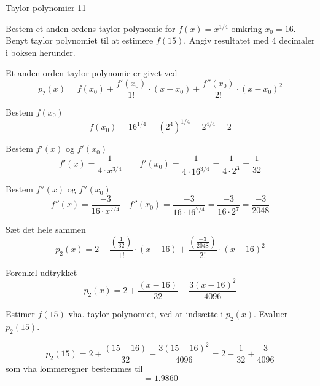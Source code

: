 \documentclass{article}
\begin{document}
\begin{exercise}{Taylor polynomier 11}
	
	Bestem et anden ordens taylor polynomie for $f(x) =x^{1/4}$ 
	omkring $x_0 = 16$.
	Benyt taylor polynomiet til at estimere $f(15)$.
	Angiv resultatet med 4 decimaler i boksen herunder.

\lommeregnertilladt
	
	\hint
	Et anden orden taylor polynomie 
	er givet ved
	\[
	p_2(x) = f(x_0) + \frac{f'(x_0)}{1!} \cdot (x - x_0)
	+ \frac{f''(x_0)}{2!} \cdot (x - x_0)^2
	\]
	
	
	\hint
	Bestem $f(x_0)$
	\[
	f(x_0) = 16^{1/4}  = \left(2^4\right)^{1/4} = 2^{4/4} = 2
	\]
	
	\hint
	Bestem $f'(x)$ og $f'(x_0)$
	\[
	f'(x) = \frac{1}{4 \cdot x^{3/4}} \qquad f'(x_0) = \frac{1}{4 \cdot 16^{3/4}} = \frac{1}{4 \cdot 2^3} = \frac{1}{32} 
	\]
	
	\hint
	Bestem $f''(x)$ og $f''(x_0)$
	\[
	f''(x) =\frac{-3}{16 \cdot x^{7/4}}  \quad f''(x_0) = \frac{-3}{16 \cdot 16^{7/4}} = \frac{-3}{16 \cdot 2^7} = \frac{-3}{2048}
	\]
	
	
	\hint
	Sæt det hele sammen
	\[
	p_2(x) = 2 + \frac{ \left(\frac{1}{32} \right)}{1!} \cdot (x-16) + \frac{ \left( \frac{-3}{2048}\right)}{2!} \cdot (x-16)^2
	\]
	
	\hint
	Forenkel udtrykket
	\[
	p_2(x) = 2 + \frac{(x-16)}{32} - \frac{3(x-16)^2}{4096}
	\]
	
	\hint
	Estimer $f(15)$ vha. taylor polynomiet, ved at indsætte i $p_2(x)$.
	Evaluer $p_2(15)$.
	
	\hint
	\[
	p_2(15) = 2 + \frac{(15-16)}{32} - \frac{3(15-16)^2}{4096} = 2 - \frac{1}{32} + \frac{3}{4096}
	\]
	som vha lommeregner bestemmes til
	\[
	= 1.9860
	\]
\end{exercise}
\end{document}
